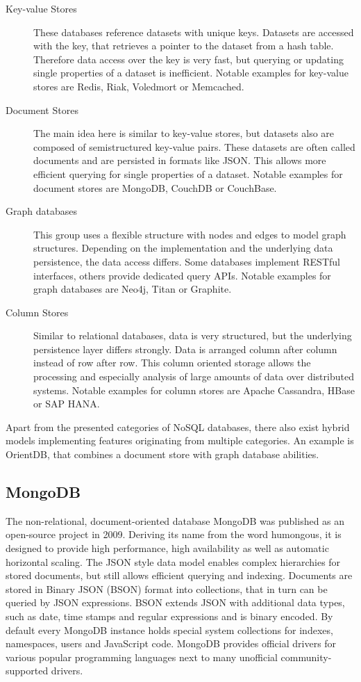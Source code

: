 \begin{description}
\item [Key-value Stores] These databases reference datasets with unique keys. Datasets are accessed with the key, that retrieves a pointer to the dataset from a hash table. Therefore data access over the key is very fast, but querying or updating single properties of a dataset is inefficient. Notable examples for key-value stores are Redis, Riak, Voledmort or Memcached.
\item [Document Stores] The main idea here is similar to key-value stores, but datasets also are composed of semistructured key-value pairs. These datasets are often called documents and are persisted in formats like JSON. This allows more efficient querying for single properties of a dataset. Notable examples for document stores are MongoDB, CouchDB or CouchBase.
\item [Graph databases] This group uses a flexible structure with nodes and edges to model graph structures. Depending on the implementation and the underlying data persistence, the data access differs. Some databases implement RESTful interfaces, others provide dedicated query APIs. Notable examples for graph databases are Neo4j, Titan or Graphite.
\item [Column Stores] Similar to relational databases, data is very structured, but the underlying persistence layer differs strongly. Data is arranged column after column instead of row after row. This column oriented storage allows the processing and especially analysis of large amounts of data over distributed systems. Notable examples for column stores are Apache Cassandra, HBase or SAP HANA.
\end{description}

Apart from the presented categories of NoSQL databases, there also exist hybrid models implementing features originating from multiple categories. An example is OrientDB, that combines a document store with graph database abilities. 

\subsection{MongoDB}
The non-relational, document-oriented database MongoDB was published as an open-source project in 2009. Deriving its name from the word humongous, it is designed to provide high performance, high availability as well as automatic horizontal scaling. The JSON style data model enables complex hierarchies for stored documents, but still allows efficient querying and indexing. Documents are stored in Binary JSON (BSON) format into collections, that in turn can be queried by JSON expressions. BSON extends JSON with additional data types, such as date, time stamps and regular expressions and is binary encoded. By default every MongoDB instance holds special system collections for indexes, namespaces, users and JavaScript code. MongoDB provides official drivers for various popular programming languages next to many unofficial community-supported drivers. 

